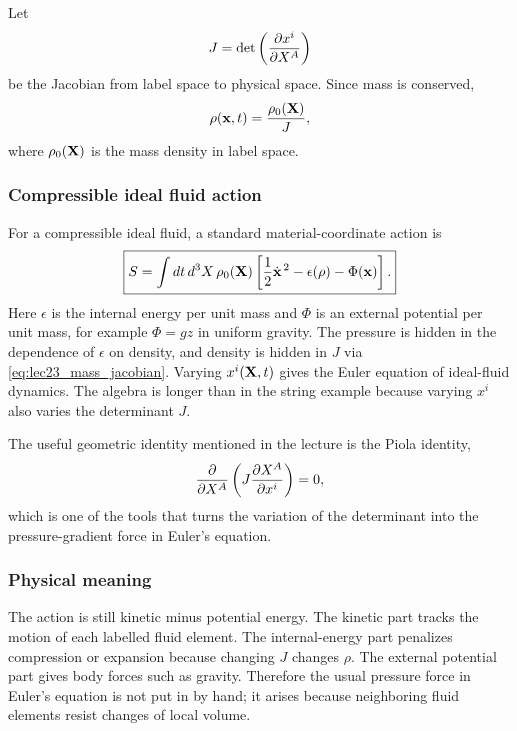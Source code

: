 \documentclass[../main.tex]{subfiles}
\begin{document}
Let
\begin{equation}
  J=\det\left(\pdv{x^i}{X^A}\right)
  \label{eq:lec23_jacobian}
\end{equation}
be the Jacobian from label space to physical space.  Since mass is conserved,
\begin{equation}
  \rho(\mathbf{x},t)=\frac{\rho_0(\mathbf{X})}{J},
  \label{eq:lec23_mass_jacobian}
\end{equation}
where $\rho_0(\mathbf{X})$ is the mass density in label space.

\subsubsection*{Compressible ideal fluid action}
For a compressible ideal fluid, a standard material-coordinate action is
\begin{equation}
  \boxed{
  S=\int dt\,d^3X\,\rho_0(\mathbf{X})
  \left[\frac12\dot{\mathbf{x}}^{\,2}-\epsilon(\rho)-\Phi(\mathbf{x})\right].}
  \label{eq:lec23_compressible_fluid_action}
\end{equation}
Here $\epsilon$ is the internal energy per unit mass and $\Phi$ is an external
potential per unit mass, for example $\Phi=gz$ in uniform gravity.  The pressure
is hidden in the dependence of $\epsilon$ on density, and density is hidden in
$J$ via \eqref{eq:lec23_mass_jacobian}.  Varying $x^i(\mathbf{X},t)$ gives the
Euler equation of ideal-fluid dynamics.  The algebra is longer than in the
string example because varying $x^i$ also varies the determinant $J$.

The useful geometric identity mentioned in the lecture is the Piola identity,
\begin{equation}
  \pdv{}{X^A}\left(J\pdv{X^A}{x^i}\right)=0,
  \label{eq:lec23_piola_identity}
\end{equation}
which is one of the tools that turns the variation of the determinant into the
pressure-gradient force in Euler's equation.

\subsubsection*{Physical meaning}
The action is still kinetic minus potential energy.  The kinetic part tracks the
motion of each labelled fluid element.  The internal-energy part penalizes
compression or expansion because changing $J$ changes $\rho$.  The external
potential part gives body forces such as gravity.  Therefore the usual pressure
force in Euler's equation is not put in by hand; it arises because neighboring
fluid elements resist changes of local volume.
\end{document}
